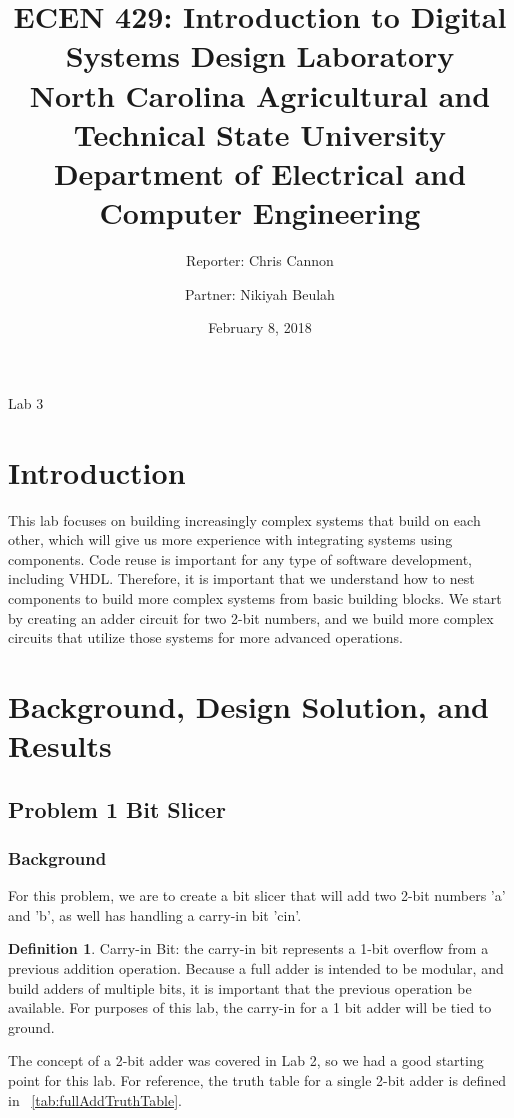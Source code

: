 \documentclass[11pt]{article}
\title {ECEN 429: Introduction to Digital Systems Design Laboratory \\ North Carolina Agricultural and Technical State University \\ Department of Electrical and Computer Engineering} %
\author{Reporter: Chris Cannon\\ \and Partner: Nikiyah Beulah} %
\date{February 8, 2018}
\begin{document}
\begin{titlingpage}
\maketitle
\begin{center}
	Lab 3
\end{center}
\end{titlingpage}

\section{Introduction}
This lab focuses on building increasingly complex systems that build on each other, which will give us more experience with integrating systems using components. Code reuse is important for any type of software development, including VHDL. Therefore, it is important that we understand how to nest components to build more complex systems from basic building blocks. We start by creating an adder circuit for two 2-bit numbers, and we build more complex circuits that utilize those systems for more advanced operations.

\section{Background, Design Solution, and Results}

\subsection{Problem 1 Bit Slicer}

\subsubsection{Background}
For this problem, we are to create a bit slicer that will add two 2-bit numbers 'a' and 'b', as well has handling a carry-in bit 'cin'.

\theoremstyle{definition}
\newtheorem{definition}{Definition}
\begin{definition}
Carry-in Bit: the carry-in bit represents a 1-bit overflow from a previous addition operation. Because a full adder is intended to be modular, and build adders of multiple bits, it is important that the previous operation be available. For purposes of this lab, the carry-in for a 1 bit adder will be tied to ground.
\end{definition}

The concept of a 2-bit adder was covered in Lab 2, so we had a good starting point for this lab. For reference, the truth table for a single 2-bit adder is defined in ~\ref{tab:fullAddTruthTable}.
\end{document}
